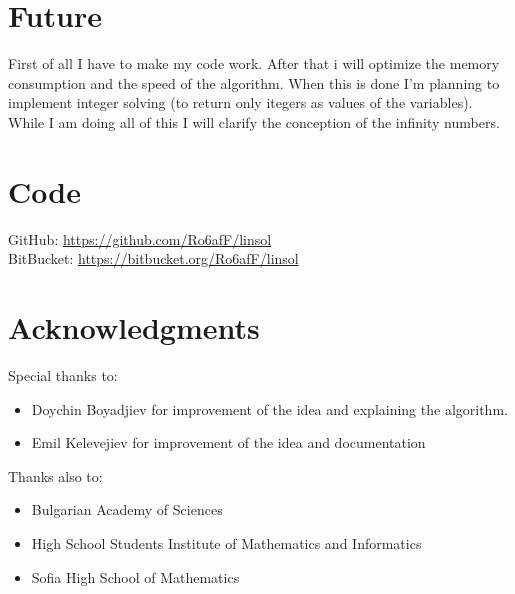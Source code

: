 \documentclass[]{article}
\begin{document}
	\section{Future}
	First of all I have to make my code work. After that i will optimize the memory consumption and the speed of the algorithm. When this is done I'm planning to implement integer solving (to return only itegers as values of the variables). While I am doing  all of this I will clarify the conception of the infinity numbers.
	\section{Code}
	GitHub: \href{https://github.com/Ro6afF/linsol}{https://github.com/Ro6afF/linsol}\\
	BitBucket: \href{https://bitbucket.org/Ro6afF/linsol}{https://bitbucket.org/Ro6afF/linsol}
	\section{Acknowledgments}
 	 	 \Large{Special thanks to:
 	 	 \begin{itemize}
 	 	 	\item Doychin Boyadjiev for improvement of the idea and explaining the algorithm.
 	 	 	\item Emil Kelevejiev for improvement of the idea and documentation
 	 	 \end{itemize}
		 }
		 \large{Thanks also to:
 	 	 \begin{itemize}
 	 	 	\item Bulgarian Academy of Sciences
 	 	 	\item High School Students Institute of Mathematics and Informatics
 	 	 	\item Sofia High School of Mathematics
 	 	 \end{itemize}}
\end{document}
